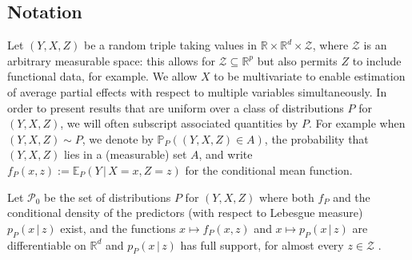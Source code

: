 \documentclass[aos]{imsart}
\newcommand{\pr}{\mathbb{P}}
\newcommand{\R}{\mathbb{R}}
\newcommand{\E}{\mathbb{E}}
\newcommand{\given}{\,|\,}
\begin{document}
%	
	
	\subsection{Notation} \label{sec:notation}
	Let $(Y,X,Z)$ be a random triple taking values in $\R\times \R^d\times\mathcal{Z}$, where $\mathcal{Z}$ is an arbitrary measurable space: this allows for $\mathcal{Z}\subseteq \R^p$ but also permits $Z$ to include functional data, for example. We allow $X$ to be multivariate to enable estimation of average partial effects with respect to multiple variables simultaneously.
	In order to present results that are uniform over a class of distributions $P$ for $(Y,X,Z)$, we will often subscript associated quantities by $P$. For example when $(Y, X, Z) \sim P$, we denote by $\pr_P((Y, X, Z) \in A)$, the probability that $(Y, X, Z)$ lies in a (measurable) set $A$, and write $f_P(x,z) := \E_P(Y\given  X=x, Z=z)$ for the conditional mean function.
	
	Let $\mathcal{P}_0$ be the set of distributions $P$ for $(Y,X,Z)$ where both $f_P$ and  the conditional density of the predictors (with respect to Lebesgue measure) $p_P(x\given  z)$ exist, and the functions $x \mapsto f_P(x, z)$ and $x \mapsto p_P(x \given z)$ are differentiable on $\R^d$ and $p_P(x\given  z)$ has full support, for almost every $z\in\mathcal{Z}$ .
	
\end{document}
